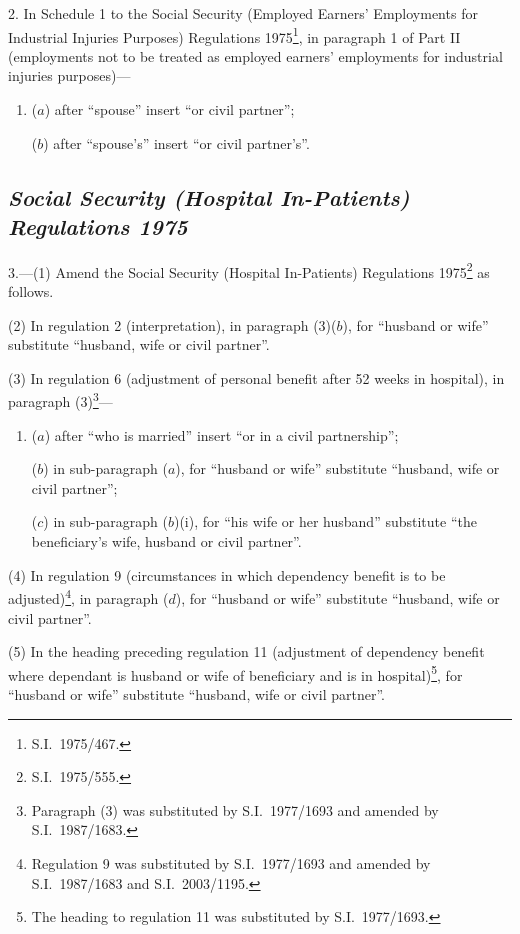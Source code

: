 \documentclass[12pt,a4paper]{article}
\begin{document}
2.  In Schedule 1 to the Social Security (Employed Earners' Employments for Industrial Injuries Purposes) Regulations 1975\footnote{S.I.\ 1975/467.}, in paragraph 1 of Part II (employments not to be treated as employed earners' employments for industrial injuries purposes)—
\begin{enumerate}\item[]
($a$) after “spouse” insert “or civil partner”;

($b$) after “spouse's” insert “or civil partner's”.
\end{enumerate}

\subsection*{\itshape\sloppy Social Security (Hospital In-Patients) Regulations 1975}

3.---(1)  Amend the Social Security (Hospital In-Patients) Regulations 1975\footnote{S.I.\ 1975/555.} as follows.

(2) In regulation 2 (interpretation), in paragraph (3)($b$), for “husband or wife” substitute “husband, wife or civil partner”.

(3) In regulation 6 (adjustment of personal benefit after 52 weeks in hospital), in paragraph (3)\footnote{Paragraph (3) was substituted by S.I.\ 1977/1693 and amended by S.I.\ 1987/\hspace{0pt}1683.}—
\begin{enumerate}\item[]
($a$) after “who is married” insert “or in a civil partnership”;

($b$) in sub-paragraph ($a$), for “husband or wife” substitute “husband, wife or civil partner”;

($c$) in sub-paragraph ($b$)(i), for “his wife or her husband” substitute “the beneficiary’s wife, husband or civil partner”.
\end{enumerate}

(4) In regulation 9 (circumstances in which dependency benefit is to be adjusted)\footnote{Regulation 9 was substituted by S.I.\ 1977/1693 and amended by S.I.\ 1987/1683 and S.I.\ 2003/1195.}, in paragraph ($d$), for “husband or wife” substitute “husband, wife or civil partner”.

\enlargethispage{-\baselineskip}

(5) In the heading preceding regulation 11 (adjustment of dependency benefit where dependant is husband or wife of beneficiary and is in hospital)\footnote{The heading to regulation 11 was substituted by S.I.\ 1977/1693.}, for “husband or wife” substitute “husband, wife or civil partner”.
\end{document}
